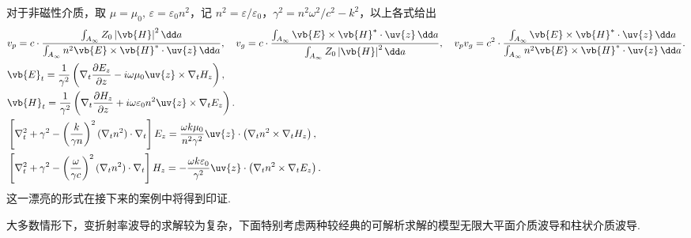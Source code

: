 对于非磁性介质，取 \(\mu = \mu_0,\,\varepsilon = \varepsilon_0 n^2\)，记 \(n^2 = \varepsilon/\varepsilon_0\)，\(\gamma^2 = n^2 \omega^2/c^2 - k^2\)，以上各式给出
\begin{align*}
	&v_p = c \cdot \dfrac{\int_{A_\infty} Z_0 \left| \vb{H} \right|^2 \dd a}{\int_{A_\infty} n^2 \vb{E} \times \vb{H}^* \cdot \uv{z} \, \dd a}, \quad v_g = c \cdot \dfrac{\int_{A_\infty} \vb{E} \times \vb{H}^* \cdot \uv{z} \, \dd a}{\int_{A_\infty} Z_0 \left| \vb{H} \right|^2 \dd a},\quad
	v_p v_g = c^2 \cdot \dfrac{\int_{A_\infty} \vb{E} \times \vb{H}^* \cdot \uv{z} \, \dd a}{\int_{A_\infty} n^2 \vb{E} \times \vb{H}^* \cdot \uv{z} \, \dd a}.\\
	&\vb{E}_t = \dfrac{1}{\gamma^2} \left( \nabla_t \dfrac{\partial E_z}{\partial z} - i\omega\mu_0 \uv{z} \times \nabla_t H_z \right), \\
	&\vb{H}_t= \dfrac{1}{\gamma^2} \left( \nabla_t \dfrac{\partial H_z}{\partial z} + i\omega\varepsilon_0 n^2 \uv{z} \times \nabla_t E_z \right).\\
	&\left[ \nabla_t^2 + \gamma^2 - \left( \dfrac{k}{\gamma n} \right)^2 (\nabla_t n^2) \cdot \nabla_t \right] E_z = \dfrac{\omega k \mu_0}{n^2 \gamma^2} \uv{z} \cdot \left( \nabla_t n^2 \times \nabla_t H_z \right), \\
	&\left[ \nabla_t^2 + \gamma^2 - \left( \dfrac{\omega}{\gamma c} \right)^2 (\nabla_t n^2) \cdot \nabla_t \right] H_z = -\dfrac{\omega k \varepsilon_0}{\gamma^2} \uv{z} \cdot \left( \nabla_t n^2 \times \nabla_t E_z \right).
\end{align*}
这一漂亮的形式在接下来的案例中将得到印证.

大多数情形下，变折射率波导的求解较为复杂，下面特别考虑两种较经典的可解析求解的模型无限大平面介质波导和柱状介质波导.

